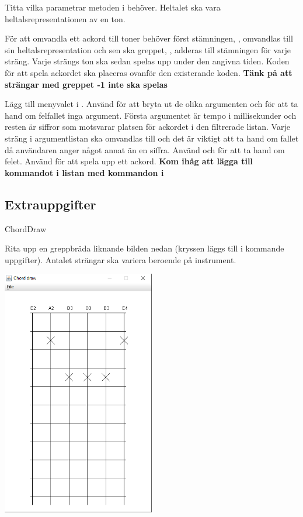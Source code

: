 {\Subtask Titta vilka parametrar metoden  i  behöver. Heltalet  ska vara heltalsrepresentationen av en ton.

\Subtask För att omvandla ett ackord till toner behöver först stämningen, , omvandlas till sin heltalsrepresentation och sen ska greppet, , adderas till stämningen för varje sträng. Varje strängs ton ska sedan spelas upp under den angivna tiden. Koden för att spela ackordet ska placeras ovanför den existerande koden. \textbf{Tänk på att strängar med greppet -1 inte ska spelas}

\Subtask Lägg till menyvalet  i . Använd  för att bryta ut de olika argumenten och för att ta hand om felfallet inga argument. Första argumentet är tempo i millisekunder och resten är siffror som motsvarar platsen för ackordet i den filtrerade listan. Varje sträng i argumentlistan ska omvandlas till  och det är viktigt att ta hand om fallet då användaren anger något annat än en siffra. Använd  och  för att ta hand om felet. Använd  för att spela upp ett ackord. \textbf{Kom ihåg att lägga till kommandot i listan med kommandon i }

\subsection{Extrauppgifter}

\Task ChordDraw

\Subtask Rita upp en greppbräda liknande bilden nedan (kryssen läggs till i kommande uppgifter). Antalet strängar ska variera beroende på instrument.

\includegraphics[width=0.5\textwidth]{../img/chords/ChordDraw}

}
